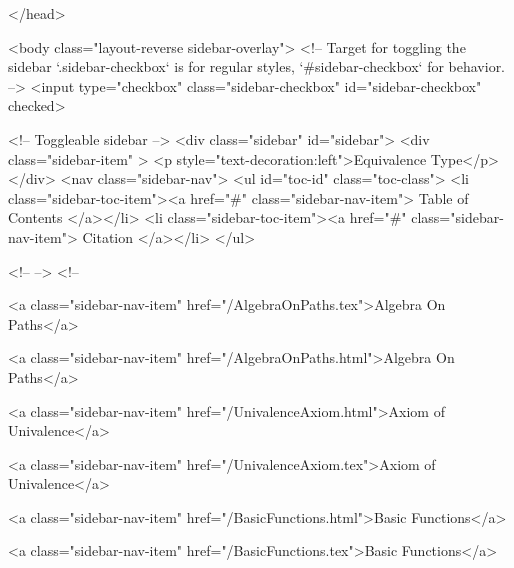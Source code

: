   
</head>




  <body class="layout-reverse sidebar-overlay">
    <!-- Target for toggling the sidebar `.sidebar-checkbox` is for regular
     styles, `#sidebar-checkbox` for behavior. -->
<input type="checkbox" class="sidebar-checkbox" id="sidebar-checkbox" checked>

<!-- Toggleable sidebar -->
<div class="sidebar" id="sidebar">
  <div class="sidebar-item" >
    <p style="text-decoration:left">Equivalence Type</p>
  </div>
  <nav class="sidebar-nav">
    <ul id="toc-id" class="toc-class">
  <li class="sidebar-toc-item"><a href="#" class="sidebar-nav-item"> Table of Contents </a></li>
  <li class="sidebar-toc-item"><a href="#" class="sidebar-nav-item"> Citation </a></li>
</ul>


    <!--  -->
    <!-- 
      
    
      
    
      
    
      
        
      
    
      
        
          <a class="sidebar-nav-item" href="/AlgebraOnPaths.tex">Algebra On Paths</a>
        
      
    
      
        
          <a class="sidebar-nav-item" href="/AlgebraOnPaths.html">Algebra On Paths</a>
        
      
    
      
        
          <a class="sidebar-nav-item" href="/UnivalenceAxiom.html">Axiom of Univalence</a>
        
      
    
      
        
          <a class="sidebar-nav-item" href="/UnivalenceAxiom.tex">Axiom of Univalence</a>
        
      
    
      
        
          <a class="sidebar-nav-item" href="/BasicFunctions.html">Basic Functions</a>
        
      
    
      
        
          <a class="sidebar-nav-item" href="/BasicFunctions.tex">Basic Functions</a>
        
      
    
